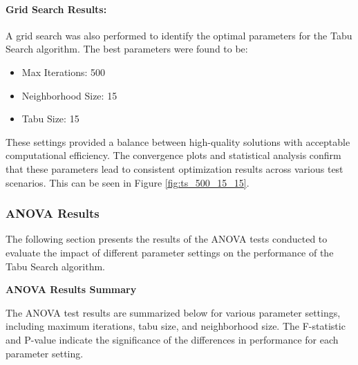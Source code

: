 \documentclass[
]{article}
\begin{document}
    \paragraph{Grid Search Results:}
    A grid search was also performed to identify the optimal parameters for the Tabu Search algorithm. The best parameters were found to be:
    \begin{itemize}
        \item Max Iterations: 500
        \item Neighborhood Size: 15
        \item Tabu Size: 15
    \end{itemize}
    These settings provided a balance between high-quality solutions with acceptable computational efficiency. The convergence plots and statistical analysis confirm that these parameters lead to consistent optimization results across various test scenarios. This can be seen in Figure \ref{fig:ts_500_15_15}.

    \subsubsection{ANOVA Results}

    The following section presents the results of the ANOVA tests conducted to evaluate the impact of different parameter settings on the performance of the Tabu Search algorithm.

    \textbf{ANOVA Results Summary}

    The ANOVA test results are summarized below for various parameter settings, including maximum iterations, tabu size, and neighborhood size. The F-statistic and P-value indicate the significance of the differences in performance for each parameter setting.
\end{document}
